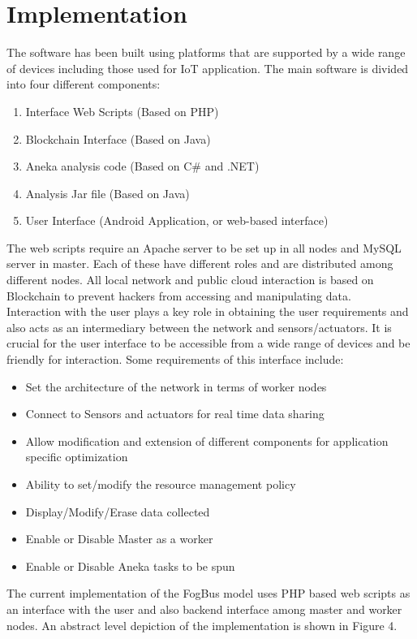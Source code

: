 \documentclass[10pt,journal,compsoc]{IEEEtran}
\begin{document}
\section{Implementation}
The software has been built using platforms that are supported by a wide range of devices including those used for IoT application. The main software is divided into four different components:
\begin{enumerate}
\item Interface Web Scripts (Based on PHP)
\item Blockchain Interface (Based on Java)
\item Aneka analysis code (Based on C\# and .NET)
\item Analysis Jar file (Based on Java)
\item User Interface (Android Application, or web-based interface)
\end{enumerate}
The web scripts require an Apache server to be set up in all nodes and MySQL server in master. Each of these have different roles and are distributed among different nodes. All local network and public cloud interaction is based on Blockchain to prevent hackers from accessing and manipulating data.\\
Interaction with the user plays a key role in obtaining the user requirements and also acts as an intermediary between the network and sensors/actuators. It is crucial for the user interface to be accessible from a wide range of devices and be friendly for interaction. Some requirements of this interface include:
\begin{itemize}
\item Set the architecture of the network in terms of worker nodes
\item Connect to Sensors and actuators for real time data sharing
\item Allow modification and extension of different components for application specific optimization
\item Ability to set/modify the resource management policy
\item Display/Modify/Erase data collected
\item Enable or Disable Master as a worker
\item Enable or Disable Aneka tasks to be spun
\end{itemize}
The current implementation of the FogBus model uses PHP based web scripts as an interface with the user and also backend interface among master and worker nodes. An abstract level depiction of the implementation is shown in Figure 4.
\end{document}
